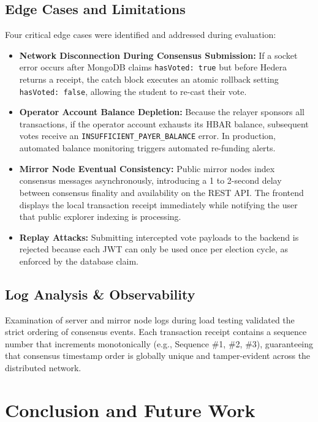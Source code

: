 \documentclass[12pt, a4paper]{article}
\begin{document}
\subsection{Edge Cases and Limitations}
Four critical edge cases were identified and addressed during evaluation:
\begin{itemize}[leftmargin=*]
    \item \textbf{Network Disconnection During Consensus Submission:} If a socket error occurs after MongoDB claims \texttt{hasVoted: true} but before Hedera returns a receipt, the catch block executes an atomic rollback setting \texttt{hasVoted: false}, allowing the student to re-cast their vote.
    \item \textbf{Operator Account Balance Depletion:} Because the relayer sponsors all transactions, if the operator account exhausts its HBAR balance, subsequent votes receive an \texttt{INSUFFICIENT\_PAYER\_BALANCE} error. In production, automated balance monitoring triggers automated re-funding alerts.
    \item \textbf{Mirror Node Eventual Consistency:} Public mirror nodes index consensus messages asynchronously, introducing a 1 to 2-second delay between consensus finality and availability on the REST API. The frontend displays the local transaction receipt immediately while notifying the user that public explorer indexing is processing.
    \item \textbf{Replay Attacks:} Submitting intercepted vote payloads to the backend is rejected because each JWT can only be used once per election cycle, as enforced by the database claim.
\end{itemize}

\subsection{Log Analysis \& Observability}
Examination of server and mirror node logs during load testing validated the strict ordering of consensus events. Each transaction receipt contains a sequence number that increments monotonically (e.g., Sequence \#1, \#2, \#3), guaranteeing that consensus timestamp order is globally unique and tamper-evident across the distributed network.

\section{Conclusion and Future Work}
\end{document}

